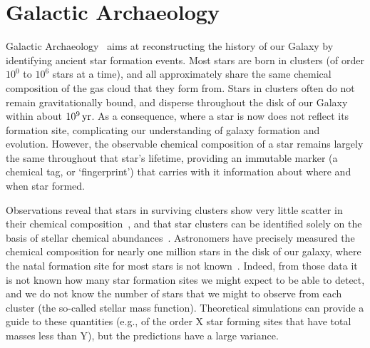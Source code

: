 \documentclass{elsarticle}
\begin{document}
\section{Galactic Archaeology}
Galactic Archaeology~\cite{freeman2002new} aims at reconstructing the history 
of our Galaxy by identifying ancient star formation events. Most stars are 
born in clusters (of order $10^0$ to $10^6$ stars at a time), and all approximately
share the same chemical composition of the gas cloud that they form from.
Stars in clusters often do not remain gravitationally bound, and disperse 
throughout the disk of our Galaxy within about $10^9\,{\rm yr}$. %
As a consequence, where a star is now does not reflect its formation site, 
complicating our understanding of galaxy formation and evolution. However, the
observable chemical composition of a star remains largely the same throughout
that star's lifetime, providing an immutable marker (a chemical tag, or
`fingerprint') that carries with it information about where and when star
formed.


Observations reveal that stars in surviving clusters show very little scatter
in their chemical composition~\cite{pancino2010chemical}, and that star
clusters can be identified solely on the basis of stellar chemical
abundances~\cite{hogg2016kmeans}. Astronomers have precisely measured the
chemical composition for nearly one million stars in the disk of our galaxy,
where the natal formation site for most stars is not known~\cite{galah}.
Indeed, from those data it is not known how many star formation sites we might
expect to be able to detect, and we do not know the number of stars that we
might to observe from each cluster (the so-called stellar mass function).
Theoretical simulations can provide a guide to these quantities (e.g., of the
order X star forming sites that have total masses less than Y), but the
predictions have a large variance.
\end{document}
